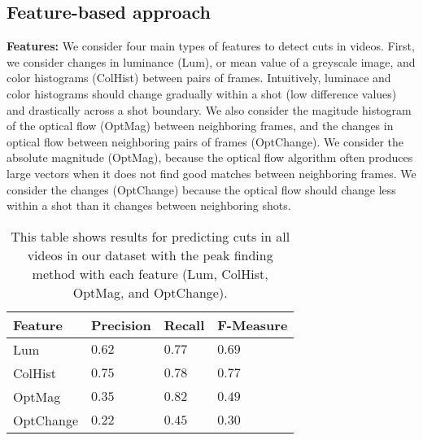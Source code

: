 \subsection*{Feature-based approach}

\textbf{Features:} We consider four main types of features to detect cuts in videos. First, we consider changes in luminance (Lum), or mean value of a greyscale image, and color histograms (ColHist) between pairs of frames. Intuitively, luminace and color histograms should change gradually within a shot (low difference values) and drastically across a shot boundary. We also consider the magitude histogram of the optical flow (OptMag) between neighboring frames, and the changes in optical flow between neighboring pairs of frames (OptChange). We consider the absolute magnitude (OptMag), because the optical flow algorithm often produces large vectors when it does not find good matches between neighboring frames. We consider the changes (OptChange) because the optical flow should change less within a shot than it changes between neighboring shots.
\\

\begin{table}[h!]
  \begin{center}
  	\small{
	\begin{tabular}{l|lll}
	Feature   & Precision  & Recall     & F-Measure  \\ \hline
	Lum       & $0.62$ & $0.77$ & $0.69 $ \\
	ColHist   & $0.75$ & $0.78$ & $0.77$ \\
	OptMag    & $0.35$ & $0.82$ & $0.49$ \\
	OptChange & $0.22$ & $0.45$ & $0.30$ \\ \hline
	\end{tabular}
	}
  \end{center}
  \label{table:peakresults}
  \caption{This table shows results for predicting cuts in all videos in our dataset with the peak finding method with each feature (Lum, ColHist, OptMag, and OptChange).}
\end{table} 

